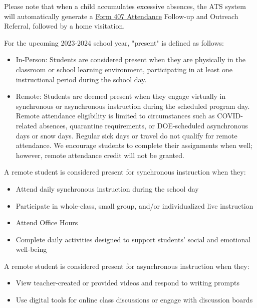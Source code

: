 \documentclass[11pt]{article}
\begin{document}
Please note that when a child accumulates excessive absences, the ATS system will automatically generate a \href{https://www.schools.nyc.gov/docs/default-source/default-document-library/a-210-english.pdf}{Form 407 Attendance} Follow-up and Outreach Referral, followed by a home visitation.

For the upcoming 2023-2024 school year, "present" is defined as follows:
\begin{itemize}
\item In-Person: Students are considered present when they are physically in the classroom or school learning environment, participating in at least one instructional period during the school day.
\item Remote: Students are deemed present when they engage virtually in synchronous or asynchronous instruction during the scheduled program day. Remote attendance eligibility is limited to circumstances such as COVID-related absences, quarantine requirements, or DOE-scheduled asynchronous days or snow days. Regular sick days or travel do not qualify for remote attendance. We encourage students to complete their assignments when well; however, remote attendance credit will not be granted.
\end{itemize}

A remote student is considered present for synchronous instruction when they:
\begin{itemize}
\item Attend daily synchronous instruction during the school day
\item Participate in whole-class, small group, and/or individualized live instruction
\item Attend Office Hours
\item Complete daily activities designed to support students’ social and emotional well-being
\end{itemize}

A remote student is considered present for asynchronous instruction when they:
\begin{itemize}
\item View teacher-created or provided videos and respond to writing prompts
\item Use digital tools for online class discussions or engage with discussion boards
\end{itemize}
\end{document}
